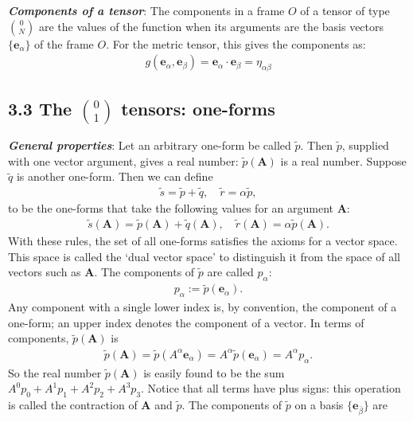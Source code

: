 \documentclass[12pt]{book}
\begin{document}
        \textit{\textbf{Components of a tensor}}: The components in a frame \(O\) of a tensor of type $\binom{0}{N}$ are the values of the function when its arguments are the basis vectors \(\{ \mathbf{e}_\alpha \}\) of the frame \(O\). For the metric tensor, this gives the components as:
         \begin{align}
         g(\mathbf{e}_\alpha, \mathbf{e}_\beta) = \mathbf{e}_\alpha \cdot \mathbf{e}_\beta = \eta_{\alpha\beta} \tag{3.5}
         \end{align}

    \subsection{3.3 The \(\binom{0}{1}\) tensors: one-forms}

    \textit{\textbf{General properties}}: Let an arbitrary one-form be called \(\tilde{p}\). Then \(\tilde{p}\), supplied with one vector argument, gives a real number: \(\tilde{p}(\mathbf{A})\) is a real number. Suppose \(\tilde{q}\) is another one-form. Then we can define
    \begin{align}
    \tilde{s} = \tilde{p} + \tilde{q}, \quad \tilde{r} = \alpha \tilde{p},
    \end{align}
    to be the one-forms that take the following values for an argument \(\mathbf{A}\):
    \begin{align}
    \tilde{s}(\mathbf{A}) = \tilde{p}(\mathbf{A}) + \tilde{q}(\mathbf{A}), \quad \tilde{r}(\mathbf{A}) = \alpha \tilde{p}(\mathbf{A}).
    \end{align}
    With these rules, the set of all one-forms satisfies the axioms for a vector space. This space is called the ‘dual vector space’ to distinguish it from the space of all vectors such as \(\mathbf{A}\).
    The components of \(\tilde{p}\) are called \(p_\alpha\):
    \begin{align}
    p_\alpha := \tilde{p}(\mathbf{e}_\alpha). \tag{3.7}
    \end{align}
    Any component with a single lower index is, by convention, the component of a one-form; an upper index denotes the component of a vector. In terms of components, \(\tilde{p}(\mathbf{A})\) is
    \begin{align}
    \tilde{p}(\mathbf{A}) = \tilde{p}(A^\alpha \mathbf{e}_\alpha)
    = A^\alpha \tilde{p}(\mathbf{e}_\alpha)= A^\alpha p_\alpha. \tag{3.8}
    \end{align}
    So the real number \(\tilde{p}(\mathbf{A})\) is easily found to be the sum \(A^0p_0 + A^1p_1 + A^2p_2 + A^3p_3\). Notice that all terms have plus signs: this operation is called the contraction of \(\mathbf{A}\) and \(\tilde{p}\). The components of \(\tilde{p}\) on a basis \(\{\mathbf{e}_{\bar{\beta}}\}\) are
\end{document}
